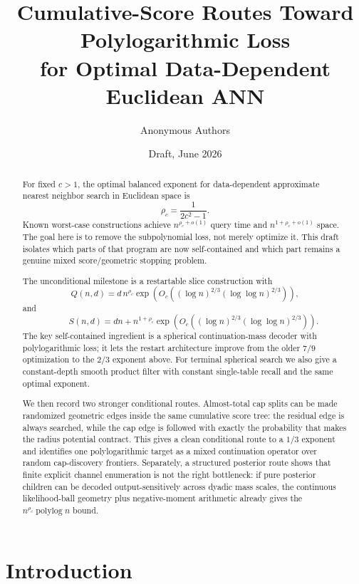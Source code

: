 \documentclass[10pt]{article}
\title{Cumulative-Score Routes Toward Polylogarithmic Loss\\
for Optimal Data-Dependent Euclidean ANN}
\author{Anonymous Authors}
\date{Draft, June 2026}
\theoremstyle{definition}
\newcommand{\polylog}{\operatorname{polylog}}
\begin{document}
\maketitle

\begin{abstract}
   For fixed $c>1$, the optimal balanced exponent for data-dependent approximate nearest neighbor search in Euclidean space is
   \[
      \rho_c=\frac{1}{2c^2-1}.
   \]
   Known worst-case constructions achieve $n^{\rho_c+o(1)}$ query time and $n^{1+\rho_c+o(1)}$ space. The goal here is to remove the subpolynomial loss, not merely optimize it. This draft isolates which parts of that program are now self-contained and which part remains a genuine mixed score/geometric stopping problem.

   The unconditional milestone is a restartable slice construction with
   \[
      Q(n,d)=
      d\,n^{\rho_c}
      \exp\!\left(
         O_c\!\left((\log n)^{2/3}(\log\log n)^{2/3}\right)
      \right),
   \]
   and
   \[
      \qquad
      S(n,d)=
      dn+n^{1+\rho_c}
      \exp\!\left(
         O_c\!\left((\log n)^{2/3}(\log\log n)^{2/3}\right)
      \right).
   \]
   The key self-contained ingredient is a spherical continuation-mass decoder with polylogarithmic loss; it lets the restart architecture improve from the older $7/9$ optimization to the $2/3$ exponent above. For terminal spherical search we also give a constant-depth smooth product filter with constant single-table recall and the same optimal exponent.

   We then record two stronger conditional routes. Almost-total cap splits can be made randomized geometric edges inside the same cumulative score tree: the residual edge is always searched, while the cap edge is followed with exactly the probability that makes the radius potential contract. This gives a clean conditional route to a $1/3$ exponent and identifies one polylogarithmic target as a mixed continuation operator over random cap-discovery frontiers. Separately, a structured posterior route shows that finite explicit channel enumeration is not the right bottleneck: if pure posterior children can be decoded output-sensitively across dyadic mass scales, the continuous likelihood-ball geometry plus negative-moment arithmetic already gives the $n^{\rho_c}\polylog n$ bound.
\end{abstract}

\section{Introduction}
\end{document}
